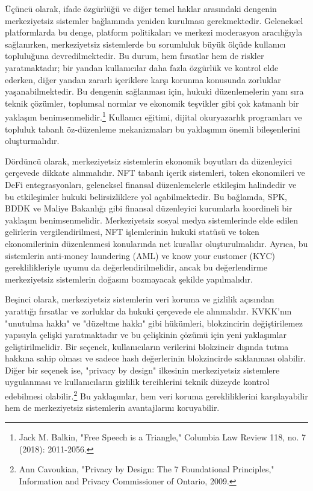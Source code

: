 \documentclass[11pt,a4paper]{article}
\begin{document}
Üçüncü olarak, ifade özgürlüğü ve diğer temel haklar arasındaki dengenin merkeziyetsiz sistemler bağlamında yeniden kurulması gerekmektedir. Geleneksel platformlarda bu denge, platform politikaları ve merkezi moderasyon aracılığıyla sağlanırken, merkeziyetsiz sistemlerde bu sorumluluk büyük ölçüde kullanıcı topluluğuna devredilmektedir. Bu durum, hem fırsatlar hem de riskler yaratmaktadır; bir yandan kullanıcılar daha fazla özgürlük ve kontrol elde ederken, diğer yandan zararlı içeriklere karşı korunma konusunda zorluklar yaşanabilmektedir. Bu dengenin sağlanması için, hukuki düzenlemelerin yanı sıra teknik çözümler, toplumsal normlar ve ekonomik teşvikler gibi çok katmanlı bir yaklaşım benimsenmelidir.\footnote{Jack M. Balkin, "Free Speech is a Triangle," Columbia Law Review 118, no. 7 (2018): 2011-2056.} Kullanıcı eğitimi, dijital okuryazarlık programları ve topluluk tabanlı öz-düzenleme mekanizmaları bu yaklaşımın önemli bileşenlerini oluşturmalıdır.

Dördüncü olarak, merkeziyetsiz sistemlerin ekonomik boyutları da düzenleyici çerçevede dikkate alınmalıdır. NFT tabanlı içerik sistemleri, token ekonomileri ve DeFi entegrasyonları, geleneksel finansal düzenlemelerle etkileşim halindedir ve bu etkileşimler hukuki belirsizliklere yol açabilmektedir. Bu bağlamda, SPK, BDDK ve Maliye Bakanlığı gibi finansal düzenleyici kurumlarla koordineli bir yaklaşım benimsenmelidir. Merkeziyetsiz sosyal medya sistemlerinde elde edilen gelirlerin vergilendirilmesi, NFT işlemlerinin hukuki statüsü ve token ekonomilerinin düzenlenmesi konularında net kurallar oluşturulmalıdır. Ayrıca, bu sistemlerin anti-money laundering (AML) ve know your customer (KYC) gereklilikleriyle uyumu da değerlendirilmelidir, ancak bu değerlendirme merkeziyetsiz sistemlerin doğasını bozmayacak şekilde yapılmalıdır.

Beşinci olarak, merkeziyetsiz sistemlerin veri koruma ve gizlilik açısından yarattığı fırsatlar ve zorluklar da hukuki çerçevede ele alınmalıdır. KVKK'nın "unutulma hakkı" ve "düzeltme hakkı" gibi hükümleri, blokzincirin değiştirilemez yapısıyla çelişki yaratmaktadır ve bu çelişkinin çözümü için yeni yaklaşımlar geliştirilmelidir. Bir seçenek, kullanıcıların verilerini blokzincir dışında tutma hakkına sahip olması ve sadece hash değerlerinin blokzincirde saklanması olabilir. Diğer bir seçenek ise, "privacy by design" ilkesinin merkeziyetsiz sistemlere uygulanması ve kullanıcıların gizlilik tercihlerini teknik düzeyde kontrol edebilmesi olabilir.\footnote{Ann Cavoukian, "Privacy by Design: The 7 Foundational Principles," Information and Privacy Commissioner of Ontario, 2009.} Bu yaklaşımlar, hem veri koruma gerekliliklerini karşılayabilir hem de merkeziyetsiz sistemlerin avantajlarını koruyabilir.
\end{document}
